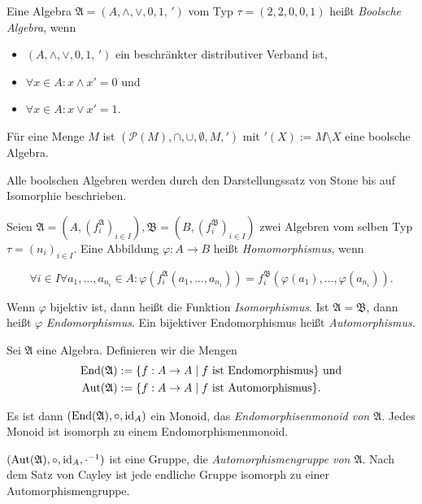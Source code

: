 \begin{definition}
    Eine Algebra $\mathfrak{A} = (A, \wedge, \vee, 0, 1, \,')$ vom Typ $\tau = (2,2,0,0,1)$ heißt \emph{Boolsche Algebra}, wenn
    \begin{itemize}[topsep=0pt, label={--}]
        \item $(A, \wedge, \vee, 0, 1, \,')$ ein beschränkter distributiver Verband ist,
        \item $\forall x \in A: x \wedge x' = 0$ und
        \item $\forall x \in A: x \vee x' = 1$.
    \end{itemize}
\end{definition}

\begin{example}
    Für eine Menge $M$ ist $(\mathcal{P}(M), \cap, \cup, \emptyset, M, ')$ mit $'(X) := M \setminus X$ eine boolsche Algebra.
\end{example}

\begin{remark}
    Alle boolschen Algebren werden durch den Darstellungssatz von Stone bis auf Isomorphie beschrieben.
\end{remark}

\begin{definition}
    Seien $\mathfrak{A} = (A, (f_i^\mathfrak{A})_{i \in I}), \mathfrak{B} = (B, (f_i^\mathfrak{B})_{i \in I})$ zwei Algebren vom selben Typ $\tau = (n_i)_{i \in I}$. Eine Abbildung $\varphi: A \to B$ heißt \emph{Homomorphismus}, wenn

    $$\forall i \in I \forall a_1, \ldots, a_{n_i} \in A: \varphi(f_i^\mathfrak{A}(a_1, \ldots, a_{n_i})) = f_i^\mathfrak{B}(\varphi(a_1), \ldots, \varphi(a_{n_i})). $$

    Wenn $\varphi$ bijektiv ist, dann heißt die Funktion \emph{Isomorphismus}.
    Ist $\mathfrak{A} = \mathfrak{B}$, dann heißt $\varphi$ \emph{Endomorphismus}. Ein bijektiver Endomorphismus heißt \emph{Automorphismus}.
\end{definition}

\begin{example}
    Sei $\mathfrak{A}$ eine Algebra. Definieren wir die Mengen \begin{align*}
        \operatorname{End}(\mathfrak{A}) &:= \{f: A \to A \mid f\text{ ist Endomorphismus}\} \text{ und} \\ \operatorname{Aut}(\mathfrak{A}) &:= \{f: A \to A \mid f\text{ ist Automorphismus}\}.
    \end{align*}

    Es ist dann $(\operatorname{End}(\mathfrak{A}), \circ, \operatorname{id}_A)$ ein Monoid, das \emph{Endomorphisenmonoid von $\mathfrak{A}$}. Jedes Monoid ist isomorph zu einem Endomorphismenmonoid.
    
    $(\operatorname{Aut}(\mathfrak{A}), \circ, \operatorname{id}_A, \cdot^{-1})$ ist eine Gruppe, die \emph{Automorphismengruppe von $\mathfrak{A}$}. Nach dem Satz von Cayley ist jede endliche Gruppe isomorph zu einer Automorphismengruppe.
\end{example}